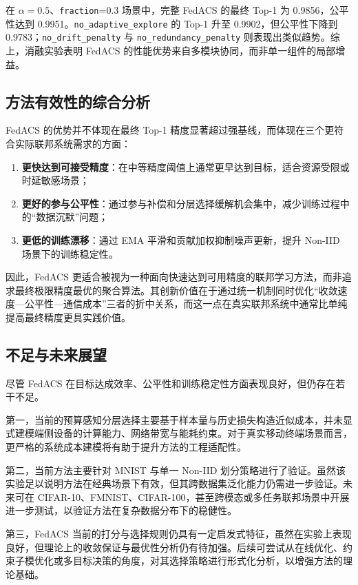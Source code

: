 \documentclass[UTF8,11pt]{ctexart}
\begin{document}
在 $\alpha=0.5$、\texttt{fraction}=0.3 场景中，完整 FedACS 的最终 Top-1 为 0.9856，公平性达到 0.9951。\texttt{no\_adaptive\_explore} 的 Top-1 升至 0.9902，但公平性下降到 0.9783；\texttt{no\_drift\_penalty} 与 \texttt{no\_redundancy\_penalty} 则表现出类似趋势。综上，消融实验表明 FedACS 的性能优势来自多模块协同，而非单一组件的局部增益。

\subsection{方法有效性的综合分析}
FedACS 的优势并不体现在最终 Top-1 精度显著超过强基线，而体现在三个更符合实际联邦系统需求的方面：
\begin{enumerate}
  \item \textbf{更快达到可接受精度}：在中等精度阈值上通常更早达到目标，适合资源受限或时延敏感场景；
  \item \textbf{更好的参与公平性}：通过参与补偿和分层选择缓解机会集中，减少训练过程中的“数据沉默”问题；
  \item \textbf{更低的训练漂移}：通过 EMA 平滑和贡献加权抑制噪声更新，提升 Non-IID 场景下的训练稳定性。
\end{enumerate}
因此，FedACS 更适合被视为一种面向快速达到可用精度的联邦学习方法，而非追求最终极限精度最优的聚合算法。其创新价值在于通过统一机制同时优化“收敛速度—公平性—通信成本”三者的折中关系，而这一点在真实联邦系统中通常比单纯提高最终精度更具实践价值。

\subsection{不足与未来展望}
尽管 FedACS 在目标达成效率、公平性和训练稳定性方面表现良好，但仍存在若干不足。

第一，当前的预算感知分层选择主要基于样本量与历史损失构造近似成本，并未显式建模端侧设备的计算能力、网络带宽与能耗约束。对于真实移动终端场景而言，更严格的系统成本建模将有助于提升方法的工程适配性\cite{perazzone2024communication,wang2025resource,yuan2024multimodal}。

第二，当前方法主要针对 MNIST 与单一 Non-IID 划分策略进行了验证。虽然该实验足以说明方法在经典场景下有效，但其跨数据集泛化能力仍需进一步验证。未来可在 CIFAR-10、FMNIST、CIFAR-100，甚至跨模态或多任务联邦场景中开展进一步测试，以验证方法在复杂数据分布下的稳健性\cite{fu2023client,chen2023multimodal,wang2024fedgma,chen2024missing}。

第三，FedACS 当前的打分与选择规则仍具有一定启发式特征，虽然在实验上表现良好，但理论上的收敛保证与最优性分析仍有待加强。后续可尝试从在线优化、约束子模优化或多目标决策的角度，对其选择策略进行形式化分析，以增强方法的理论基础\cite{zhang2024submodular,wang2025resource,liu2024recent}。
\end{document}
